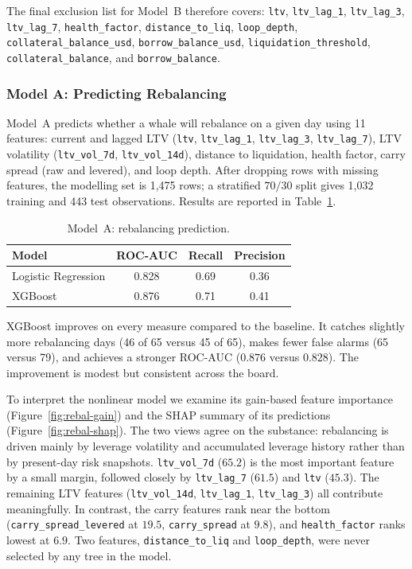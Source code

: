 The final exclusion list for Model~B therefore covers: \texttt{ltv},
\texttt{ltv\_lag\_1}, \texttt{ltv\_lag\_3}, \texttt{ltv\_lag\_7},
\texttt{health\_factor}, \texttt{distance\_to\_liq},
\texttt{loop\_depth}, \texttt{collateral\_balance\_usd},
\texttt{borrow\_balance\_usd}, \texttt{liquidation\_threshold},
\texttt{collateral\_balance}, and \texttt{borrow\_balance}.

\subsubsection{Model A: Predicting Rebalancing}
\label{sec:model-rebalancing}

Model~A predicts whether a whale will rebalance on a given day using 11
features: current and lagged LTV (\texttt{ltv}, \texttt{ltv\_lag\_1},
\texttt{ltv\_lag\_3}, \texttt{ltv\_lag\_7}), LTV volatility
(\texttt{ltv\_vol\_7d}, \texttt{ltv\_vol\_14d}), distance to liquidation,
health factor, carry spread (raw and levered), and loop depth.
After dropping rows with missing features, the modelling set is 1{,}475
rows; a stratified $70/30$ split gives 1{,}032 training and 443 test
observations. Results are reported in Table~\ref{tab:model-a}.

\begin{table}[t]
\centering
\caption{Model~A: rebalancing prediction.}
\label{tab:model-a}
\begin{tabular}{lccc}
\hline
Model & ROC-AUC & Recall & Precision \\
\hline
Logistic Regression & 0.828 & 0.69 & 0.36 \\
XGBoost             & 0.876 & 0.71 & 0.41 \\
\hline
\end{tabular}
\end{table}

XGBoost improves on every measure compared to the baseline. It catches
slightly more rebalancing days (46 of 65 versus 45 of 65), makes fewer
false alarms (65 versus 79), and achieves a stronger ROC-AUC ($0.876$
versus $0.828$). The improvement is modest but consistent across the
board.

To interpret the nonlinear model we examine its gain-based feature
importance (Figure~\ref{fig:rebal-gain}) and the SHAP summary of its
predictions (Figure~\ref{fig:rebal-shap}). The two views agree on the
substance: rebalancing is driven mainly by leverage volatility and
accumulated leverage history rather than by present-day risk snapshots.
\texttt{ltv\_vol\_7d} ($65.2$) is the most important feature by a small
margin, followed closely by \texttt{ltv\_lag\_7} ($61.5$) and
\texttt{ltv} ($45.3$). The remaining LTV features
(\texttt{ltv\_vol\_14d}, \texttt{ltv\_lag\_1}, \texttt{ltv\_lag\_3}) all
contribute meaningfully. In contrast, the carry features rank near the
bottom (\texttt{carry\_spread\_levered} at $19.5$, \texttt{carry\_spread}
at $9.8$), and \texttt{health\_factor} ranks lowest at $6.9$. Two
features, \texttt{distance\_to\_liq} and \texttt{loop\_depth}, were never
selected by any tree in the model.

